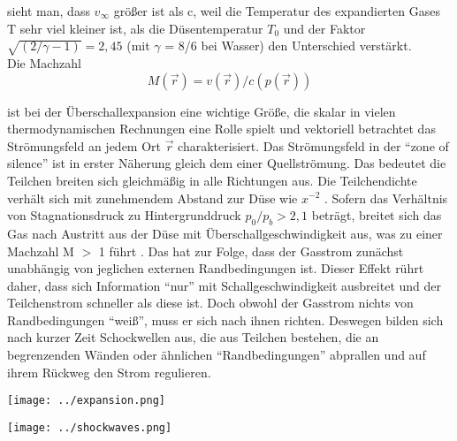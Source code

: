 sieht man, dass $v_{\infty}$ größer ist als c, weil die Temperatur des expandierten Gases T sehr viel kleiner ist, als die Düsentemperatur $T_0$ und der Faktor $\sqrt{(2/\gamma -1)}=2,45$ (mit $\gamma$ = 8/6 bei Wasser) den Unterschied verstärkt.\\
Die Machzahl 
\begin{equation}
M(\vec{r})= v(\vec{r})/c(p(\vec{r}))
\end{equation}

ist bei der Überschallexpansion eine wichtige Größe, die skalar in vielen thermodynamischen Rechnungen eine Rolle spielt und vektoriell betrachtet das Strömungsfeld an jedem Ort $\vec{r}$ charakterisiert. Das Strömungsfeld in der \enquote{zone of silence} ist in erster Näherung gleich dem einer Quellströmung. Das bedeutet die Teilchen breiten sich gleichmäßig in alle Richtungen aus. Die Teilchendichte verhält sich mit zunehmendem Abstand zur Düse wie $x^{-2}$ \cite{hagena1981nucleation}. Sofern das Verhältnis von Stagnationsdruck zu Hintergrunddruck $p_0/p_b > 2,1$ beträgt, breitet sich das Gas nach Austritt aus der Düse mit Überschallgeschwindigkeit aus, was zu einer Machzahl M $>$ 1 führt \cite{scoles1988}. Das hat zur Folge, dass der Gasstrom zunächst unabhängig von jeglichen externen Randbedingungen ist. Dieser Effekt rührt daher, dass sich Information \enquote{nur} mit Schallgeschwindigkeit ausbreitet und der Teilchenstrom schneller als diese ist. Doch obwohl der Gasstrom nichts von Randbedingungen \enquote{weiß}, muss er sich nach ihnen richten. Deswegen bilden sich nach kurzer Zeit Schockwellen aus, die aus Teilchen bestehen, die an begrenzenden Wänden oder ähnlichen \enquote{Randbedingungen} abprallen und auf ihrem Rückweg den Strom regulieren. 
%
\begin{center}
\begin{minipage}{\linewidth}
\centering
\texttt{[image: ../expansion.png]}%
 \label{fig:Machexpansion}
\end{minipage} 
\end{center} 

\begin{center}
\begin{minipage}{\linewidth}
\centering
\texttt{[image: ../shockwaves.png]}%
 \label{fig:Schockwellen}
\end{minipage} 
\end{center} 

